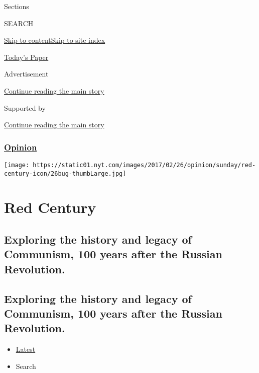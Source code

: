 Sections

SEARCH

\protect\hyperlink{site-content}{Skip to
content}\protect\hyperlink{site-index}{Skip to site index}

\href{https://myaccount.nytimes.com/auth/login?response_type=cookie\&client_id=vi}{}

\href{https://www.nytimes.com/section/todayspaper}{Today's Paper}

Advertisement

\protect\hyperlink{after-top}{Continue reading the main story}

Supported by

\protect\hyperlink{after-sponsor}{Continue reading the main story}

\hypertarget{opinion}{%
\subsubsection{\texorpdfstring{\href{/section/opinion}{Opinion}}{Opinion}}\label{opinion}}

\texttt{[image: https://static01.nyt.com/images/2017/02/26/opinion/sunday/red-century-icon/26bug-thumbLarge.jpg]}

\hypertarget{red-century}{%
\section{Red Century}\label{red-century}}

\hypertarget{exploring-the-history-and-legacy-of-communism-100-years-after-the-russian-revolution}{%
\subsection{Exploring the history and legacy of Communism, 100 years
after the Russian
Revolution.}\label{exploring-the-history-and-legacy-of-communism-100-years-after-the-russian-revolution}}

\hypertarget{exploring-the-history-and-legacy-of-communism-100-years-after-the-russian-revolution-1}{%
\subsection{Exploring the history and legacy of Communism, 100 years
after the Russian
Revolution.}\label{exploring-the-history-and-legacy-of-communism-100-years-after-the-russian-revolution-1}}

\begin{itemize}
\tightlist
\item
  \protect\hyperlink{stream-panel}{Latest}
\item
  Search
\end{itemize}

